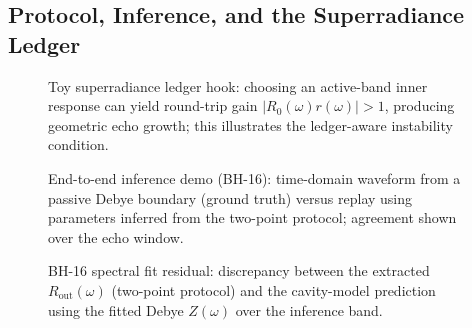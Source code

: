   \subsection{Protocol, Inference, and the Superradiance Ledger} \label{sec:bh-protocol}
    
    
    \begin{figure}[t]
      \centering
      \caption{Toy superradiance ledger hook: choosing an active-band inner response can yield round-trip gain $|R_0(\omega)r(\omega)|>1$, producing geometric echo growth; this illustrates the ledger-aware instability condition.}
      \label{fig:bh-superradiance-gain}
    \end{figure}
    \begin{figure}[t]
      \centering
      \caption{End-to-end inference demo (BH-16): time-domain waveform from a passive Debye boundary (ground truth) versus replay using parameters inferred from the two-point protocol; agreement shown over the echo window.}
      \label{fig:bh-fdtd-fit-waveform}
    \end{figure}
    \begin{figure}[t]
      \centering
      \caption{BH-16 spectral fit residual: discrepancy between the extracted $R_{\mathrm{out}}(\omega)$ (two-point protocol) and the cavity-model prediction using the fitted Debye $Z(\omega)$ over the inference band.}
      \label{fig:bh-fdtd-fit-R-error}
    \end{figure}

